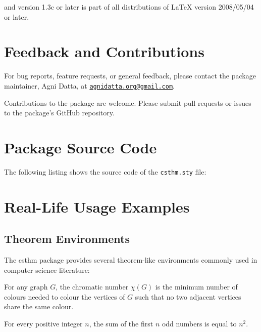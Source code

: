 \documentclass{ltxdoc}
\newcommand{\pkg}[1]{\textsf{#1}}
\begin{document}
and version 1.3c or later is part of all distributions of LaTeX version 2008/05/04 or later.

\section{Feedback and Contributions}

For bug reports, feature requests, or general feedback, please contact the package maintainer, Agni Datta, at \texttt{\hyperlink{mailto:agnidatta.org@gmail.com}{agnidatta.org@gmail.com}}.

Contributions to the package are welcome. Please submit pull requests or issues to the package's GitHub repository.

\section{Package Source Code}

The following listing shows the source code of the \texttt{csthm.sty} file:



\appendix

\section{Real-Life Usage Examples}

\subsection{Theorem Environments}

The \pkg{csthm} package provides several theorem-like environments commonly used in computer science literature:

\begin{theorem}
	For any graph $G$, the chromatic number $\chi(G)$ is the minimum number of colours needed to colour the vertices of $G$ such that no two adjacent vertices share the same colour.
\end{theorem}

\begin{lemma}
	For every positive integer $n$, the sum of the first $n$ odd numbers is equal to $n^2$.
\end{lemma}
\end{document}
